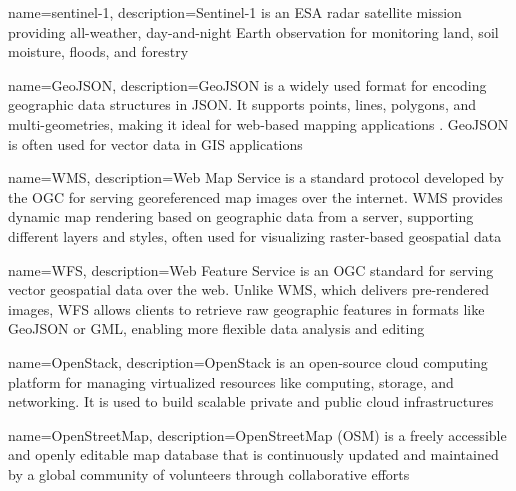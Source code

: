 {
    name=sentinel-1,
    description={Sentinel-1 is an ESA radar satellite mission providing all-weather, day-and-night Earth observation for monitoring land, soil moisture, floods, and forestry \cite{esa_sentinel-1}}
}

{
    name=GeoJSON,
    description={GeoJSON is a widely used format for encoding geographic data structures in JSON. It supports points, lines, polygons, and multi-geometries, making it ideal for web-based mapping applications \cite{geojson}. GeoJSON is often used for vector data in GIS applications}
}

{
    name=WMS,
    description={Web Map Service is a standard protocol developed by the OGC for serving georeferenced map images over the internet. WMS provides dynamic map rendering based on geographic data from a server, supporting different layers and styles, often used for visualizing raster-based geospatial data \cite{ogc2006wms}}
}

{
    name=WFS,
    description={Web Feature Service is an OGC standard for serving vector geospatial data over the web. Unlike WMS, which delivers pre-rendered images, WFS allows clients to retrieve raw geographic features in formats like GeoJSON or GML, enabling more flexible data analysis and editing \cite{ogc2005wfs}}
}

{
    name=OpenStack,
    description={OpenStack is an open-source cloud computing platform for managing virtualized resources like computing, storage, and networking. It is used to build scalable private and public cloud infrastructures \cite{openstack}}
}

{
    name=OpenStreetMap,
    description={OpenStreetMap (OSM) is a freely accessible and openly editable map database that is continuously updated and maintained by a global community of volunteers through collaborative efforts \cite{openstreetmap}}
}




